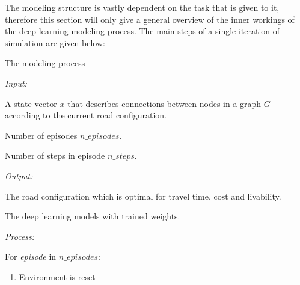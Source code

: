 \documentclass[
]{elteikthesis}[2023/04/10]
\begin{document}
The modeling structure is vastly dependent on the task that is given
to it, therefore this section will only give a general overview of
the inner workings of the deep learning modeling process. The main
steps of a single iteration of simulation are given below:
\begin{center}
\begin{algorithm}[H]
\caption{The modeling process}

\begin{singlespace}
\emph{Input: }
\end{singlespace}
\begin{enumerate}
\begin{singlespace}
\item A state vector $x$ that describes connections between nodes in a
graph $G$ according to the current road configuration.
\item Number of episodes $n\_episodes$.
\item Number of steps in episode $n\_steps$.
\end{singlespace}
\end{enumerate}
\begin{singlespace}
\emph{Output: }
\end{singlespace}
\begin{enumerate}
\begin{singlespace}
\item The road configuration which is optimal for travel time, cost and
livability.
\item The deep learning models with trained weights. 
\end{singlespace}
\end{enumerate}
\begin{singlespace}
\emph{Process:}
\end{singlespace}
\begin{enumerate}
\begin{singlespace}
\item For \emph{episode} in $n\_episodes$:
\end{singlespace}
\begin{enumerate}
\item Environment is reset
\end{enumerate}
\end{enumerate}
\end{algorithm}
\end{center}
\end{document}
